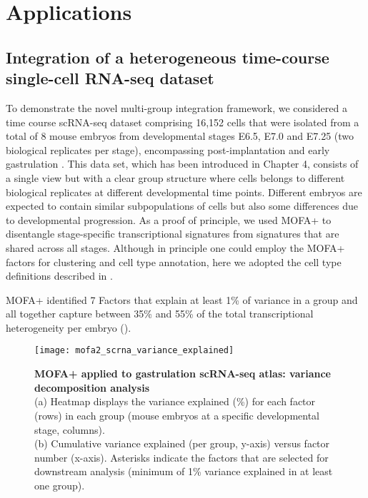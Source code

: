 \section{Applications}

\subsection{Integration of a heterogeneous time-course single-cell RNA-seq dataset}

To demonstrate the novel multi-group integration framework, we considered a time course scRNA-seq dataset comprising 16,152 cells that were isolated from a total of 8 mouse embryos from developmental stages E6.5, E7.0 and E7.25 (two biological replicates per stage), encompassing post-implantation and early gastrulation \cite{Pijuan-Sala2019}. This data set, which has been introduced in Chapter 4, consists of a single view but with a clear group structure where cells belongs to different biological replicates at different developmental time points. Different embryos are expected to contain similar subpopulations of cells but also some differences due to developmental progression. As a proof of principle, we used MOFA+ to disentangle stage-specific transcriptional signatures from signatures that are shared across all stages. Although in principle one could employ the MOFA+ factors for clustering and cell type annotation, here we adopted the cell type definitions described in \cite{Pijuan-Sala2019}.

MOFA+ identified 7 Factors that explain at least 1\% of variance in a group and all together capture between 35\% and 55\% of the total transcriptional heterogeneity per embryo ().

\begin{figure}[H]
	\centering
	\texttt{[image: mofa2\_scrna\_variance\_explained]}
	\caption[]{
	\textbf{MOFA+ applied to gastrulation scRNA-seq atlas: variance decomposition analysis} \\
	(a) Heatmap displays the variance explained (\%) for each factor (rows) in each group (mouse embryos at a specific developmental stage, columns).\\
	(b) Cumulative variance explained (per group, y-axis) versus factor number (x-axis). Asterisks indicate the factors that are selected for downstream analysis (minimum of 1\% variance explained in at least one group).
	}
	\label{fig:mofa2_scrna_variance_explained}
\end{figure}



